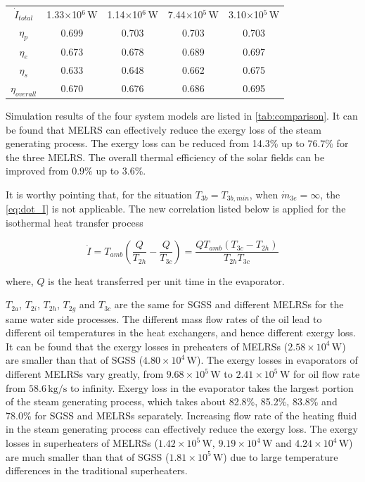 \begin{table}[htbp]
\begin{tabular}{ccccc}
		$\dot{I}_{total}$    &    1.33$\times$10$^6\,\mathrm{W}$    &  1.14$\times$10$^6\,\mathrm{W}$  &	7.44$\times$10$^5\,\mathrm{W}$	&	3.10$\times$10$^5\,\mathrm{W}$\\
		$\eta_p$    &    0.699    &	0.703	&    0.703	&	0.703\\
		$\eta_e$    &    0.673    &	0.678	& 0.689	&	0.697\\
		$\eta_s$    &    0.633    &  0.648	&  0.662	&	0.675\\
		$\eta_{overall}$    &    0.670   &	0.676	&    0.686	&	0.695\\
		\bottomrule
	\end{tabular}
	\label{tab:comparison}
\end{table}

Simulation results of the four system models are listed in \autoref{tab:comparison}. It can be found that MELRS can effectively reduce the exergy loss of the steam generating process. The exergy loss can be reduced from 14.3\% up to 76.7\% for the three MELRS. The overall thermal efficiency of the solar fields can be improved from 0.9\% up to 3.6\%.

It is worthy pointing that, for the situation $T_{3b} = T_{3b,min}$, when $\dot{m}_{3e} = \infty$, the \autoref{eq:dot_I} is not applicable. The new correlation listed below is applied for the isothermal heat transfer process

\begin{equation}
  \dot{I} = T_{amb} (\frac{Q}{T_{2h}} - \frac{Q}{T_{3c}}) = \frac{QT_{amb}(T_{3c} - T_{2h})}{T_{2h}T_{3c}}
  \label{eq:isothermal}
\end{equation}

where, $Q$ is the heat transferred per unit time in the evaporator.

$T_{2a}$, $T_{2i}$, $T_{2h}$, $T_{2g}$ and $T_{3c}$ are the same for SGSS and different MELRSs for the same water side processes. The different mass flow rates of the oil lead to different oil temperatures in the heat exchangers, and hence different exergy loss. It can be found that the exergy losses in preheaters of MELRSs ($2.58\times 10^4\,\mathrm{W}$) are smaller than that of SGSS ($4.80\times10^4\,\mathrm{W}$). The exergy losses in evaporators of different MELRSs vary greatly, from $9.68\times10^5\,\mathrm{W}$ to $2.41\times10^5\,\mathrm{W}$ for oil flow rate from $58.6\,\mathrm{kg/s}$ to infinity.
Exergy loss in the evaporator takes the largest portion of the steam generating process, which takes about 82.8\%, 85.2\%, 83.8\% and 78.0\% for SGSS and MELRSs separately.
Increasing flow rate of the heating fluid in the steam generating process can effectively reduce the exergy loss.
The exergy losses in superheaters of MELRSs ($1.42\times 10^5\,\mathrm{W}$, $9.19\times 10^4\,\mathrm{W}$ and $4.24\times 10^4\,\mathrm{W}$) are much smaller than that of SGSS ($1.81\times10^5\,\mathrm{W}$) due to large temperature differences in the traditional superheaters.

